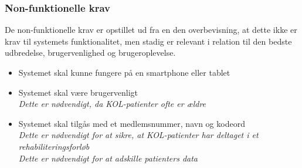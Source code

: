 \subsubsection{Non-funktionelle krav}
De non-funktionelle krav er opstillet ud fra en den overbevisning, at dette ikke er krav til systemets funktionalitet, men stadig er relevant i relation til den bedste udbredelse, brugervenlighed og brugeroplevelse. 

\begin{itemize}
\item Systemet skal kunne fungere på en smartphone eller tablet 
\item Systemet skal være brugervenligt
	\\
	\textit{Dette er nødvendigt, da KOL-patienter ofte er ældre}
	
\item Systemet skal tilgås med et medlemsnummer, navn og kodeord
	\\
	\textit{Dette er nødvendigt for at sikre, at KOL-patienter har deltaget i et rehabiliteringsforløb}
	\\
	\textit{Dette er nødvendigt for at adskille patienters data}
\end{itemize}